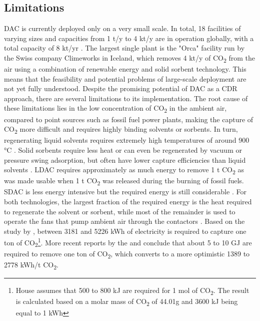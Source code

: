\subsection*{Limitations}
DAC is currently deployed only on a very small scale. In total, 18 facilities of varying sizes and capacities from 1 t/y to 4 kt/y are in operation globally, with a total capacity of 8 kt/yr \parencite[18]{IEA2022DirectZero}. The largest single plant is the "Orca" facility run by the Swiss company Climeworks in Iceland, which removes 4 kt/y of CO\textsubscript{2} from the air using a combination of renewable energy and solid sorbent technology. This means that the feasibility and potential problems of large-scale deployment are not yet fully understood.
Despite the promising potential of DAC as a CDR approach, there are several limitations to its implementation. The root cause of these limitations lies in the low concentration of CO\textsubscript{2} in the ambient air, compared to point sources such as fossil fuel power plants, making the capture of CO\textsubscript{2} more difficult and requires highly binding solvents or sorbents. In turn, regenerating liquid solvents requires extremely high temperatures of around 900 °C \parencite[23]{IEA2022DirectZero}. Solid sorbents require less heat or can even be regenerated by vacuum or pressure swing adsorption, but often have lower capture efficiencies than liquid solvents \parencite[192]{NAS2018NegativeAgenda}.
LDAC requires approximately as much energy to remove 1 t CO\textsubscript{2} as was made usable when 1 t CO\textsubscript{2} was released during the burning of fossil fuels. SDAC is less energy intensive but the required energy is still considerable \parencite{Linow2022Kurzimpuls-Perspektiven2-Emissionen}. For both technologies, the largest fraction of the required energy is the heat required to regenerate the solvent or sorbent, while most of the remainder is used to operate the fans that pump ambient air through the contactors \parencite[203]{NAS2018NegativeAgenda}. Based on the study by \textcite{House2007ElectrochemicalChange}, between 3181 and 5226 kWh of electricity is required to capture one ton of CO\textsubscript{2}\footnote{House assumes that 500 to 800 kJ are required for 1 mol of CO\textsubscript{2}. The result is calculated based on a molar mass of CO\textsubscript{2} of 44.01g and 3600 kJ being equal to 1 kWh}. More recent reports by the \textcite{NAS2018NegativeAgenda} and \textcite{Mulligan2020CarbonShot:States} conclude that about 5 to 10 GJ are required to remove one ton of CO\textsubscript{2}, which converts to a more optimistic 1389 to 2778 kWh/t CO\textsubscript{2}.
